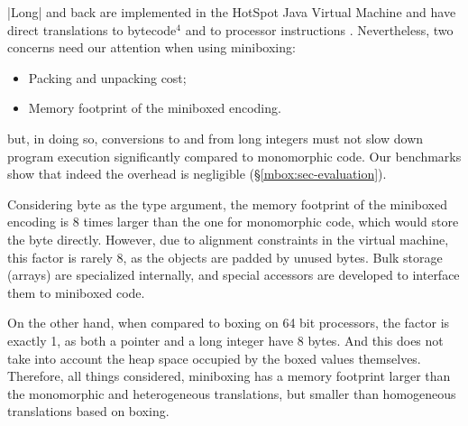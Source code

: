  |Long| and back are implemented in the HotSpot Java Virtual Machine and have direct translations to bytecode$^\text{4}$ and to processor instructions \cite{intel-ia-32-instruction-reference}. Nevertheless, two concerns need our attention when using miniboxing: %
\begin{itemize}
\item Packing and unpacking cost;
\item Memory footprint of the miniboxed encoding.
\end{itemize}

 but, in doing so, conversions to and from long integers must not slow down program execution significantly compared to monomorphic code. Our benchmarks show that indeed the overhead is negligible (\S{}\ref{mbox:sec-evaluation}).

 Considering byte as the type argument, the memory footprint of the miniboxed encoding is 8 times larger than the one for monomorphic code, which would store the byte directly. However, due to alignment constraints in the virtual machine, this factor is rarely 8, as the objects are padded by unused bytes. Bulk storage (arrays) are specialized internally, and special accessors are developed to interface them to miniboxed code.

On the other hand, when compared to boxing on 64 bit processors, the factor is exactly 1, as both a pointer and a long integer have 8 bytes. And this does not take into account the heap space occupied by the boxed values themselves. Therefore, all things considered, miniboxing has a memory footprint larger than the monomorphic and heterogeneous translations, but smaller than homogeneous translations based on boxing.

